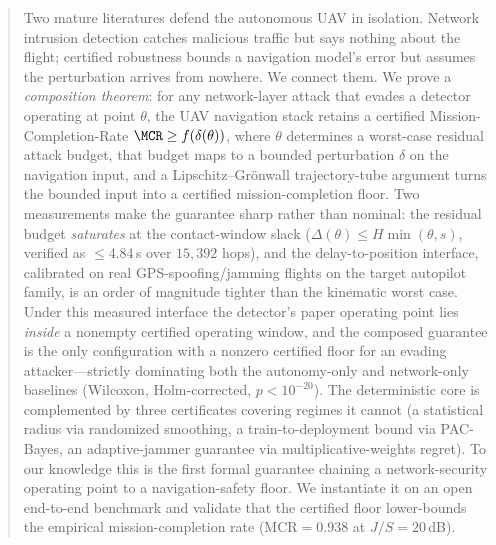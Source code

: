 \begin{abstract}
Two mature literatures defend the autonomous UAV in isolation. Network
intrusion detection catches malicious traffic but says nothing about the flight;
certified robustness bounds a navigation model's error but assumes the
perturbation arrives from nowhere. We connect them. We prove a \emph{composition
theorem}: for any network-layer attack that evades a detector operating at point
$\theta$, the UAV navigation stack retains a certified Mission-Completion-Rate
$\MCR\ge f(\delta(\theta))$, where $\theta$ determines a worst-case residual
attack budget, that budget maps to a bounded perturbation $\delta$ on the
navigation input, and a Lipschitz--Grönwall trajectory-tube argument turns the
bounded input into a certified mission-completion floor. Two measurements make
the guarantee sharp rather than nominal: the residual budget \emph{saturates}
at the contact-window slack ($\Delta(\theta)\le H\min(\theta,s)$, verified as
$\le4.84$\,s over $15{,}392$ hops), and the delay-to-position interface,
calibrated on real GPS-spoofing/jamming flights on the target autopilot family,
is an order of magnitude tighter than the kinematic worst case. Under this
measured interface the detector's paper operating point lies \emph{inside} a
nonempty certified operating window, and the composed guarantee is the only
configuration with a nonzero certified floor for an evading attacker---strictly
dominating both the autonomy-only and network-only baselines (Wilcoxon,
Holm-corrected, $p<10^{-20}$). The deterministic core is complemented by three
certificates covering regimes it cannot (a statistical radius via randomized
smoothing, a train-to-deployment bound via PAC-Bayes, an adaptive-jammer
guarantee via multiplicative-weights regret). To our knowledge this is the first
formal guarantee chaining a network-security operating point to a
navigation-safety floor. We instantiate it on an open end-to-end benchmark and
validate that the certified floor lower-bounds the empirical
mission-completion rate ($\text{MCR}=0.938$ at $J/S{=}20$\,dB).
\end{abstract}
